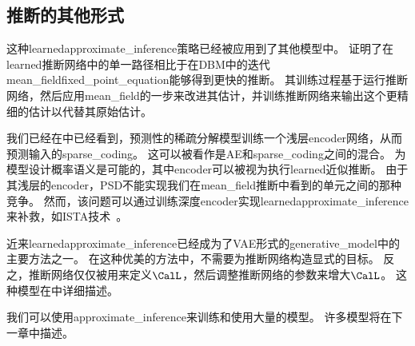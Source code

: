 \subsection{推断的其他形式}
\label{sec:other_forms_of_learned_inference}

这种\gls{learned}\gls{approximate_inference}策略已经被应用到了其他模型中。
\citet{Salakhutdinov+Larochelle-2010}证明了在\gls{learned}推断网络中的单一路径相比于在\gls{DBM}中的迭代\gls{mean_field}\gls{fixed_point_equation}能够得到更快的推断。
其训练过程基于运行推断网络，然后应用\gls{mean_field}的一步来改进其估计，并训练推断网络来输出这个更精细的估计以代替其原始估计。


我们已经在中已经看到，预测性的稀疏分解模型训练一个浅层\gls{encoder}网络，从而预测输入的\gls{sparse_coding}。
这可以被看作是\gls{AE}和\gls{sparse_coding}之间的混合。
为模型设计概率语义是可能的，其中\gls{encoder}可以被视为执行\gls{learned}近似推断。
由于其浅层的\gls{encoder}，PSD不能实现我们在\gls{mean_field}推断中看到的单元之间的那种竞争。
然而，该问题可以通过训练深度\gls{encoder}实现\gls{learned}\gls{approximate_inference}来补救，如ISTA技术~\citep{Gregor+LeCun-ICML2010}。


近来\gls{learned}\gls{approximate_inference}已经成为了\gls{VAE}形式的\gls{generative_model}中的主要方法之一\citep{Kingma+Welling-ICLR2014,Rezende-et-al-ICML2014}。
在这种优美的方法中，不需要为推断网络构造显式的目标。
反之，推断网络仅仅被用来定义$\CalL$，然后调整推断网络的参数来增大$\CalL$。
这种模型在中详细描述。

我们可以使用\gls{approximate_inference}来训练和使用大量的模型。
许多模型将在下一章中描述。















